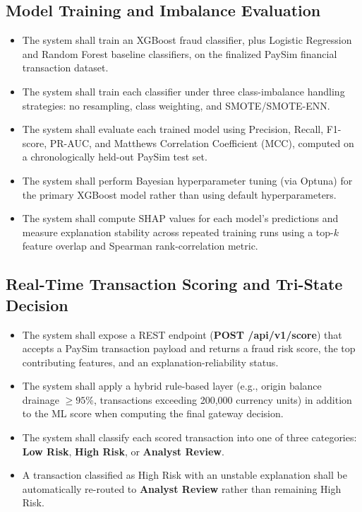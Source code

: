 \documentclass[12pt, a4paper]{report}
\begin{document}
\subsection{Model Training and Imbalance Evaluation}
\begin{itemize}
    \item[\textbf{FR-1}] The system shall train an XGBoost fraud classifier, plus Logistic Regression and Random Forest baseline classifiers, on the finalized PaySim financial transaction dataset.
    \item[\textbf{FR-2}] The system shall train each classifier under three class-imbalance handling strategies: no resampling, class weighting, and SMOTE/SMOTE-ENN.
    \item[\textbf{FR-3}] The system shall evaluate each trained model using Precision, Recall, F1-score, PR-AUC, and Matthews Correlation Coefficient (MCC), computed on a chronologically held-out PaySim test set.
    \item[\textbf{FR-4}] The system shall perform Bayesian hyperparameter tuning (via Optuna) for the primary XGBoost model rather than using default hyperparameters.
    \item[\textbf{FR-5}] The system shall compute SHAP values for each model's predictions and measure explanation stability across repeated training runs using a top-$k$ feature overlap and Spearman rank-correlation metric.
\end{itemize}

\subsection{Real-Time Transaction Scoring and Tri-State Decision}
\begin{itemize}
    \item[\textbf{FR-6}] The system shall expose a REST endpoint (\textbf{POST /api/v1/score}) that accepts a PaySim transaction payload and returns a fraud risk score, the top contributing features, and an explanation-reliability status.
    \item[\textbf{FR-7}] The system shall apply a hybrid rule-based layer (e.g., origin balance drainage $\ge 95\%$, transactions exceeding 200,000 currency units) in addition to the ML score when computing the final gateway decision.
    \item[\textbf{FR-8}] The system shall classify each scored transaction into one of three categories: \textbf{Low Risk}, \textbf{High Risk}, or \textbf{Analyst Review}.
    \item[\textbf{FR-9}] A transaction classified as High Risk with an unstable explanation shall be automatically re-routed to \textbf{Analyst Review} rather than remaining High Risk.
\end{itemize}
\end{document}
